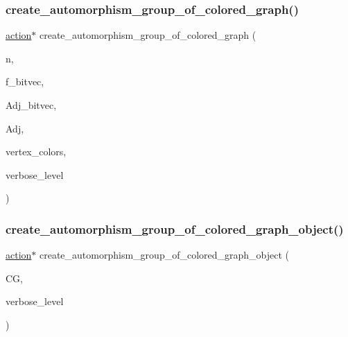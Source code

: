 \subsubsection{\texorpdfstring{create\+\_\+automorphism\+\_\+group\+\_\+of\+\_\+colored\+\_\+graph()}{create\_automorphism\_group\_of\_colored\_graph()}}
{\footnotesize\ttfamily \mbox{\hyperlink{classaction}{action}}$\ast$ create\+\_\+automorphism\+\_\+group\+\_\+of\+\_\+colored\+\_\+graph (\begin{DoxyParamCaption}\item[{\mbox{\hyperlink{galois_8h_a09fddde158a3a20bd2dcadb609de11dc}{I\+NT}}}]{n,  }\item[{\mbox{\hyperlink{galois_8h_a09fddde158a3a20bd2dcadb609de11dc}{I\+NT}}}]{f\+\_\+bitvec,  }\item[{\mbox{\hyperlink{galois_8h_a122c4acf389c050379f00341fdcd5812}{U\+B\+Y\+TE}} $\ast$}]{Adj\+\_\+bitvec,  }\item[{\mbox{\hyperlink{galois_8h_a09fddde158a3a20bd2dcadb609de11dc}{I\+NT}} $\ast$}]{Adj,  }\item[{\mbox{\hyperlink{galois_8h_a09fddde158a3a20bd2dcadb609de11dc}{I\+NT}} $\ast$}]{vertex\+\_\+colors,  }\item[{\mbox{\hyperlink{galois_8h_a09fddde158a3a20bd2dcadb609de11dc}{I\+NT}}}]{verbose\+\_\+level }\end{DoxyParamCaption})}

\mbox{\label{action__global_8_c_ad5d3919009d4cfc94c9d97690f27ef43}} 
\subsubsection{\texorpdfstring{create\+\_\+automorphism\+\_\+group\+\_\+of\+\_\+colored\+\_\+graph\+\_\+object()}{create\_automorphism\_group\_of\_colored\_graph\_object()}}
{\footnotesize\ttfamily \mbox{\hyperlink{classaction}{action}}$\ast$ create\+\_\+automorphism\+\_\+group\+\_\+of\+\_\+colored\+\_\+graph\+\_\+object (\begin{DoxyParamCaption}\item[{\mbox{\hyperlink{classcolored__graph}{colored\+\_\+graph}} $\ast$}]{CG,  }\item[{\mbox{\hyperlink{galois_8h_a09fddde158a3a20bd2dcadb609de11dc}{I\+NT}}}]{verbose\+\_\+level }\end{DoxyParamCaption})}

